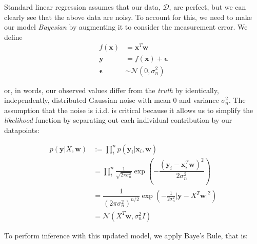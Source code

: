 Standard linear regression assumes that our data, $\mathcal{D}$, are perfect, but we can clearly see that the above data are noisy. To account for this, we need to make our model \textit{Bayesian} by augmenting it to consider the measurement error. We define
\begin{align}
    f(\mathbf{x}) &= \mathbf{x}^T\mathbf{w} \\
    \mathbf{y} &= f(\mathbf{x}) + \mathbf{\epsilon} \\
    \mathbf{\epsilon} &\sim \mathcal{N}(0, \sigma_n^2)
\end{align}

or, in words, our observed values differ from the \textit{truth} by identically, independently, distributed Gaussian noise with mean $0$ and variance $\sigma_n^2$. The assumption that the noise is i.i.d. is critical because it allows us to simplify the \textit{likelihood} function by separating out each individual contribution by our datapoints:

\begin{align}
    p(\mathbf{y}\vert X,\mathbf{w}) &:= \prod\limits_i^n p(\mathbf{y}_i \vert \mathbf{x}_i, \mathbf{w}) \\
    &= \prod\limits_i^n \frac{1}{\sqrt{2\pi\sigma_n^2}}\exp\left( -\dfrac{(\mathbf{y}_i-\mathbf{x}_i^T\mathbf{w})^2}{2\sigma_n^2}\right)\\
    &= \dfrac{1}{(2\pi\sigma_n^2)^{n/2}}\exp\left( -\frac{1}{2\sigma_n^2}\lvert \mathbf{y} - X^T\mathbf{w}\rvert^2 \right) \\
    &= \mathcal{N}\left(X^T\mathbf{w}, \sigma_n^2I\right)
\end{align}

To perform inference with this updated model, we apply Baye's Rule, that is:


